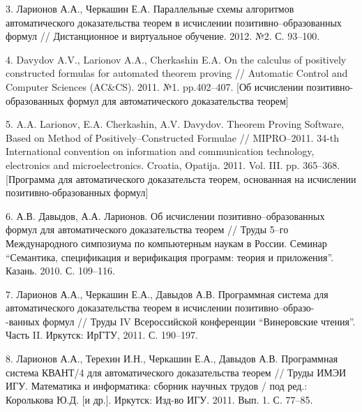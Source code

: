 \documentclass[a4paper]{report}
\begin{document}
3. Ларионов А.А., Черкашин Е.А. Параллельные схемы алгоритмов
автоматического доказательства теорем в исчислении
позитивно--образованных формул // Дистанционное и виртуальное
обучение. 2012. №2. С. 93--100.

4. Davydov A.V., Larionov A.A., Cherkashin E.A. On the calculus of
positively constructed formulas for automated theorem proving //
Automatic Control and Computer Sciences (AC\&CS). 2011. №1. pp.402--407. [Об исчислении позитивно-образованных формул для автоматического доказательства теорем]


5. A.A. Larionov, E.A. Cherkashin, A.V. Davydov. Theorem Proving
Software, Based on Method of Positively--Constructed Formulae // MIPRO--2011. 34-th International convention on information and communication
technology, electronics and microelectronics. Croatia, Opatija. 2011. Vol. III. pp. 365--368. [Программа для автоматического доказательста теорем, основанная на исчислении позитивно-образованных формул]

6. А.В. Давыдов, А.А. Ларионов. Об исчислении позитивно--образованных
формул для автоматического доказательства теорем // Труды 5--го
Международного симпозиума по компьютерным наукам в России. Семинар
``Семантика, спецификация и верификация программ: теория и приложения''. Казань. 2010. С. 109--116.

7. Ларионов А.А., Черкашин Е.А., Давыдов А.В. Программная система для
автоматического доказательства теорем в исчислении
позитивно--образо-\\-ванных формул // Труды IV
Всероссийской конференции ``Винеровские чтения''. Часть II. Иркутск: ИрГТУ, 2011. С. 190--197.

8. Ларионов А.А., Терехин И.Н., Черкашин Е.А., Давыдов А.В.
Программная система КВАНТ/4 для автоматического доказательства теорем
// Труды ИМЭИ ИГУ. Математика и информатика: сборник научных трудов / под ред.: Королькова Ю.Д. [и др.]. Иркутск: Изд-во ИГУ. 2011. Вып. 1. С. 77--85.


\end{document}
